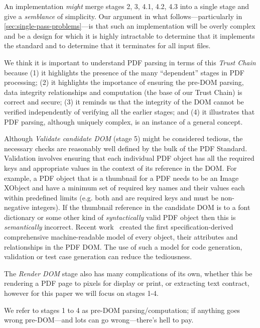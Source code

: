An implementation \emph{might} merge stages 2, 3, 4.1, 4.2, 4.3 into
a single stage and give a \emph{semblance} of simplicity.
%
Our argument in what follows---particularly in
\cref{sec:single-pass-problems}---is
that such an implementation will be overly
complex and be a design for which it is highly intractable
to determine that it implements the standard
and to determine that it terminates for all input files.

We think it is important to understand PDF parsing in terms of this
\emph{Trust Chain} because
%
(1) it highlights the presence of the many ``dependent'' stages
in PDF processing;
%
(2) it highlights the importance of ensuring the pre-DOM parsing, data integrity relationships and
computation (the base of our Trust Chain) is correct and secure;
%
(3) it reminds us that the integrity of the DOM cannot be verified
independently of verifying all the earlier stages; and
%
(4) it illustrates that PDF parsing, although uniquely complex, is an instance of
a general concept.

Although \emph{Validate candidate DOM} (stage 5) might be considered tedious, the necessary checks are 
reasonably well defined by the bulk of the PDF Standard. Validation involves ensuring that each 
individual PDF object has all the required keys and appropriate values in the context of its reference in the DOM.
For example, a PDF object that is a thumbnail for a PDF needs to be an Image XObject and have a 
minimum set of required key names and their values each within predefined limits (e.g. both
 and  are required keys and must be non-negative integers). If the 
thumbnail reference in the candidate DOM is to a font dictionary or some other kind of
\emph{syntactically} valid PDF object then this is \emph{semantically} incorrect. Recent work~\cite{wyatt2021work} created the first specification-derived comprehensive
machine-readable model of every object, their attributes and relationships in the PDF DOM. The use
of such a model for code generation, validation or test case generation can reduce the tediousness.


The \emph{Render DOM} stage also has many complications of its own, whether this be rendering a PDF
page to pixels for display or print, or extracting text contract, however for this paper we will
focus on stages 1-4.

We refer to stages 1 to 4 as pre-DOM parsing/computation; if anything
goes wrong pre-DOM---and lots can go wrong---there's hell to pay.

